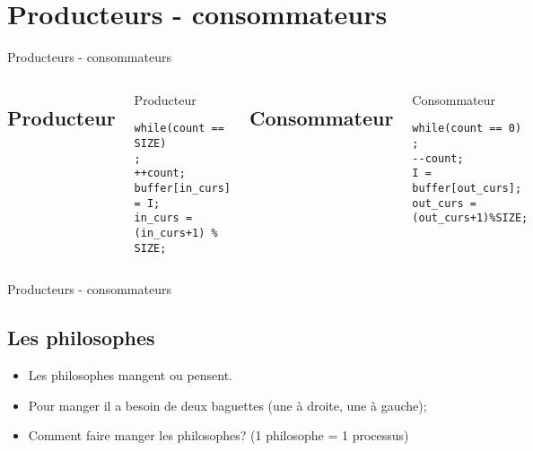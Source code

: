 \def\sectitle{Producteurs - consommateurs}
\section{\sectitle}
\begin{frame}[containsverbatim]{\sectitle}

    \begin{columns}[t]
        \def\subsectitle{Producteur}
        \subsection{\subsectitle}
        \begin{exampleblock}{\subsectitle}
            \begin{verbatim}
while(count == SIZE)
;
++count;
buffer[in_curs] = I;
in_curs = (in_curs+1) % SIZE;
            \end{verbatim}
        \end{exampleblock}

        \def\subsectitle{Consommateur}
        \subsection{\subsectitle}
        \begin{exampleblock}{\subsectitle}
            \begin{verbatim}
while(count == 0)
;
--count;
I = buffer[out_curs];
out_curs = (out_curs+1)%SIZE;
            \end{verbatim}
        \end{exampleblock}
    \end{columns}

\end{frame}


\begin{frame}{\sectitle}
    \begin{block}{\subsectitle}
        \def\subsectitle{Les philosophes}
        \subsection{\subsectitle}
        \begin{itemize}
            \item Les philosophes mangent ou pensent.
            \item Pour manger il a besoin de deux baguettes (une à droite, une à
                gauche);
            \item Comment faire manger les philosophes? (1 philosophe = 1
                processus)
        \end{itemize}
    \end{block}
\end{frame}

